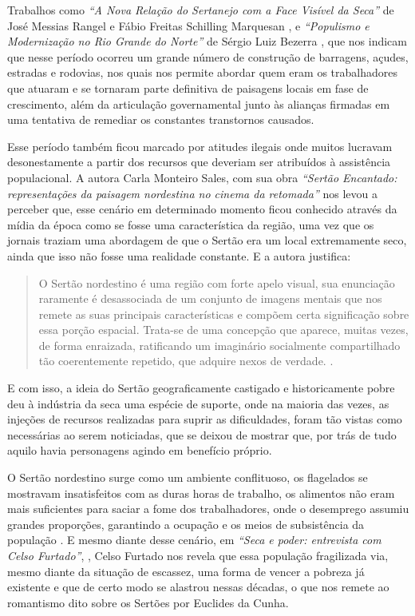 \begin{refsection}
    Trabalhos como \textit{``A Nova Relação do Sertanejo com a Face Visível da Seca''} de José Messias Rangel e Fábio Freitas Schilling Marquesan \citeyear{RangelAndMarquesan2014Nova}, e \textit{``Populismo e Modernização no Rio Grande do Norte''} de Sérgio Luiz Bezerra \textcite{Trindade2004Aluizio}, que nos indicam que nesse período ocorreu um grande número de construção de barragens, açudes, estradas e rodovias,  nos quais nos permite abordar quem eram os trabalhadores que atuaram e se tornaram parte definitiva de paisagens locais em fase de crescimento, além da articulação governamental junto às alianças firmadas em uma tentativa de remediar os constantes transtornos causados.

    Esse período também ficou marcado por atitudes ilegais onde muitos lucravam desonestamente a partir dos recursos que deveriam ser atribuídos à assistência populacional. A autora Carla Monteiro Sales, com sua obra \textit{``Sertão Encantado: representações da paisagem nordestina no cinema da retomada''} \citeyear{Sales2014Sertao} nos levou a perceber que, esse cenário em determinado momento ficou conhecido através da mídia da época como se fosse uma característica da região, uma vez que os jornais traziam uma abordagem de que o Sertão era um local extremamente seco, ainda que isso não fosse uma realidade constante. E a autora justifica: 

    \begin{quotation}
        O Sertão nordestino é uma região com forte apelo visual, sua enunciação raramente é desassociada de um conjunto de imagens mentais que nos remete as suas principais características e compõem certa significação sobre essa porção espacial. Trata-se de uma concepção que aparece, muitas vezes, de forma enraizada, ratificando um imaginário socialmente compartilhado tão coerentemente repetido, que adquire nexos de verdade. \cite[p.~115]{Sales2014Sertao}.
    \end{quotation}

    E com isso, a ideia do Sertão geograficamente castigado e historicamente pobre deu à indústria da seca uma espécie de suporte, onde na maioria das vezes, as injeções de recursos realizadas para suprir as dificuldades, foram tão vistas como necessárias ao serem noticiadas, que se deixou de mostrar que, por trás de tudo aquilo havia personagens agindo em benefício próprio. 

    O Sertão nordestino surge como um ambiente conflituoso, os flagelados se mostravam insatisfeitos com as duras horas de trabalho, os alimentos não eram mais suficientes para saciar a fome dos trabalhadores, onde o desemprego assumiu grandes proporções, garantindo a ocupação e os meios de subsistência da população \cite[p.~33]{Duarte2002Seca}. E mesmo diante desse cenário, em \textit{``Seca e poder: entrevista com Celso Furtado''}, \citeyear{Furtado1998Seca}, Celso Furtado nos revela que essa população fragilizada via, mesmo diante da situação de escassez, uma forma de vencer a pobreza já existente e que de certo modo se alastrou nessas décadas, o que nos remete ao romantismo dito sobre os Sertões por Euclides da Cunha. 


\end{refsection}
